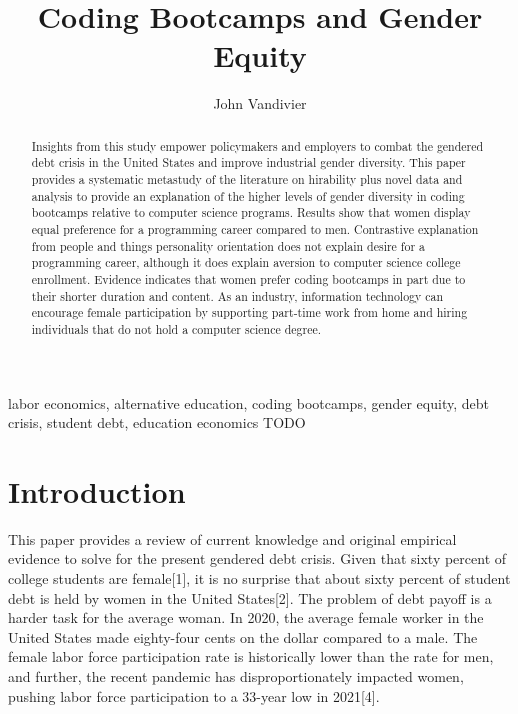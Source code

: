 \documentclass[review]{elsarticle}
\begin{document}
\begin{frontmatter}

    \title{
        Coding Bootcamps and Gender Equity
    }

    \author[mymainaddress]{John Vandivier}

    \begin{abstract}
        Insights from this study empower policymakers and employers to combat the gendered debt crisis in the United States
        and improve industrial gender diversity.
        This paper provides a systematic metastudy of the literature on hirability
        plus novel data and analysis to provide an explanation
        of the higher levels of gender diversity in coding bootcamps
        relative to computer science programs.
        Results show that women display equal preference for a programming career compared to men.
        Contrastive explanation from people and things personality orientation
        does not explain desire for a programming career,
        although it does explain aversion to computer science college enrollment.
        Evidence indicates that women prefer coding bootcamps
        in part due to their shorter duration and content.
        As an industry, information technology can encourage female participation
        by supporting part-time work from home and hiring individuals that do not hold a computer science degree.
    \end{abstract}

    \begin{keyword}
        labor economics, alternative education, coding bootcamps, gender equity, debt crisis, student debt, education economics %
        \MSC[2010] TODO %
    \end{keyword}

\end{frontmatter}

\pagebreak
\linenumbers


\section{Introduction}

This paper provides a review of current knowledge and original empirical evidence to solve for the present gendered debt crisis.
Given that sixty percent of college students are female[1],
it is no surprise that about sixty percent of student debt is held by women in the United States[2].
The problem of debt payoff is a harder task for the average woman.
In 2020, the average female worker in the United States made eighty-four cents on the dollar compared to a male.
The female labor force participation rate is historically lower than the rate for men,
and further,
the recent pandemic has disproportionately impacted women, pushing labor force participation to a 33-year low in 2021[4].
\end{document}
